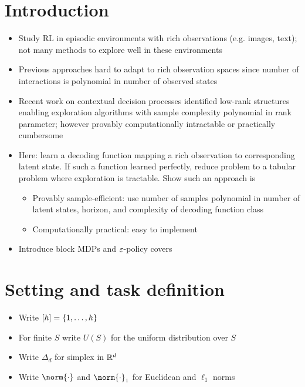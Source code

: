 \documentclass[11pt, openany]{book}
\begin{document}
\section{Introduction}
\begin{itemize}
    \item Study RL in episodic environments with rich observations (e.g. images, text); not many methods to explore well in these environments
    \item Previous approaches hard to adapt to rich observation spaces since number of interactions is polynomial in number of observed states
    \item Recent work on contextual decision processes identified low-rank structures enabling exploration algorithms with sample complexity polynomial in rank parameter; however provably computationally intractable or practically cumbersome
    \item Here: learn a decoding function mapping a rich observation to corresponding latent state. If such a function learned perfectly, reduce problem to a tabular problem where exploration is tractable. Show such an approach is
        \begin{itemize}
            \item Provably sample-efficient: use number of samples polynomial in number of latent states, horizon, and complexity of decoding function class
            \item Computationally practical: easy to implement
        \end{itemize}
    \item Introduce block MDPs and $\varepsilon$-policy covers
\end{itemize}

\section{Setting and task definition}
\begin{itemize}
    \item Write $[h]=\left\lbrace1,\dots,h\right\rbrace$
    \item For finite $S$ write $U(S)$ for the uniform distribution over $S$
    \item Write $\Delta_d$ for simplex in $\mathbb{R}^d$
    \item Write $\norm{\cdot}$ and $\norm{\cdot}_1$ for Euclidean and $\ell_1$ norms
\end{itemize}
\end{document}
